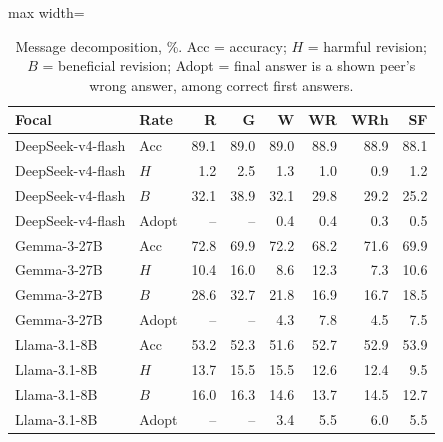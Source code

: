 \begin{table}[t]
\centering
\caption{Message decomposition, \%. Acc = accuracy; $H$ = harmful revision; $B$ = beneficial revision; Adopt = final answer is a shown peer's wrong answer, among correct first answers.}
\label{tab:x2}
\begin{adjustbox}{max width=\linewidth}
\small
\begin{tabular}{@{}llrrrrrr@{}}
\toprule
Focal & Rate & R & G & W & WR & WRh & SF \\
\midrule
DeepSeek-v4-flash & Acc & 89.1 & 89.0 & 89.0 & 88.9 & 88.9 & 88.1 \\
DeepSeek-v4-flash & $H$ & 1.2 & 2.5 & 1.3 & 1.0 & 0.9 & 1.2 \\
DeepSeek-v4-flash & $B$ & 32.1 & 38.9 & 32.1 & 29.8 & 29.2 & 25.2 \\
DeepSeek-v4-flash & Adopt & -- & -- & 0.4 & 0.4 & 0.3 & 0.5 \\
Gemma-3-27B & Acc & 72.8 & 69.9 & 72.2 & 68.2 & 71.6 & 69.9 \\
Gemma-3-27B & $H$ & 10.4 & 16.0 & 8.6 & 12.3 & 7.3 & 10.6 \\
Gemma-3-27B & $B$ & 28.6 & 32.7 & 21.8 & 16.9 & 16.7 & 18.5 \\
Gemma-3-27B & Adopt & -- & -- & 4.3 & 7.8 & 4.5 & 7.5 \\
Llama-3.1-8B & Acc & 53.2 & 52.3 & 51.6 & 52.7 & 52.9 & 53.9 \\
Llama-3.1-8B & $H$ & 13.7 & 15.5 & 15.5 & 12.6 & 12.4 & 9.5 \\
Llama-3.1-8B & $B$ & 16.0 & 16.3 & 14.6 & 13.7 & 14.5 & 12.7 \\
Llama-3.1-8B & Adopt & -- & -- & 3.4 & 5.5 & 6.0 & 5.5 \\
\bottomrule
\end{tabular}
\end{adjustbox}
\end{table}
